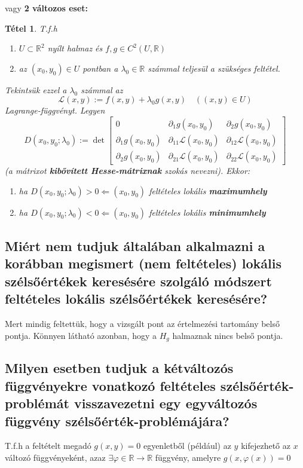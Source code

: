 \documentclass[12pt,a4paper]{article}
\newcommand{\R}{\mathbb{R}}
\newcommand{\CL}{\mathcal{L}}
\newcommand{\f}{\varphi}
\newcommand{\bb}[1]{\left( #1 \right)}
\newtheorem{tet}{Tétel}[section]
\begin{document}
vagy 
\textbf{2 változos eset:}
\begin{tet}
T.f.h
\begin{enumerate}
\item[(a)] $U \subset \R^2 $ nyílt halmaz és $f,g \in C^2(U,\R)$
\item[(b)] az $(x_0,y_0) \in U  $ pontban a $\lambda_0 \in \R $ számmal teljesül a szükséges feltétel. 
\end{enumerate}
Tekintsük ezzel a $\lambda_0$ számmal az
\[
\CL(x,y):= f(x,y) + \lambda_0g(x,y) \quad \bb{(x,y) \in U}
\]
Lagrange-függvényt. Legyen
\[
D(x_0,y_0;\lambda_0) := \det\begin{bmatrix}
0 & \partial_1g(x_0,y_0) & \partial_2g(x_0,y_0) \\
\partial_1g(x_0,y_0) & \partial_{11}\CL(x_0,y_0) & \partial_{12}\CL(x_0,y_0) \\
\partial_2g(x_0,y_0) & \partial_{21}\CL(x_0,y_0) & \partial_{22}\CL(x_0,y_0)
\end{bmatrix}
\]
(a mátrixot \textbf{kibővített Hesse-mátrixnak} szokás nevezni).
Ekkor:
\begin{enumerate}
\item ha $D(x_0,y_0;\lambda_0)> 0 \Leftarrow (x_0,y_0)$ feltételes lokális \textbf{maximumhely}
\item ha $D(x_0,y_0;\lambda_0)< 0 \Leftarrow (x_0,y_0)$ feltételes lokális \textbf{minimumhely}
\end{enumerate}
\end{tet}


\subsection{ Miért nem tudjuk általában alkalmazni a korábban megismert (nem feltételes) lokális szélsőértékek keresésére szolgáló módszert feltételes lokális szélsőértékek keresésére?}
Mert mindig feltettük, hogy a vizsgált pont az
értelmezési tartomány belső pontja. Könnyen látható azonban,
hogy a $H_g$ halmaznak nincs belső pontja.
\subsection{Milyen esetben tudjuk a kétváltozós függvényekre vonatkozó feltételes szélsőérték-problémát visszavezetni egy egyváltozós függvény szélsőérték-problémájára?}
T.f.h a feltételt megadó $g(x,y) = 0$ egyenletből (például) az $y$
kifejezhető az $x$ változó függvényeként, azaz $\exists \f \in \R \to \R $ függvény, amelyre $g(x,\f(x)) = 0 $
\end{document}
